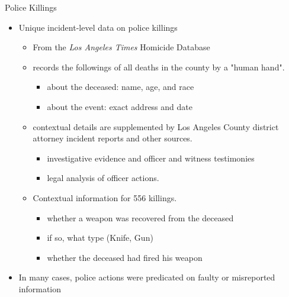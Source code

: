 \documentclass[dvipdfmx]{beamer}
\begin{document}
\begin{frame}{Police Killings}
  \begin{itemize}
    \item Unique incident-level data on police killings
    \begin{itemize}
      \item From the \textit{Los Angeles Times} Homicide Database
      \item records the followings of all deaths in the county by a "human hand".
      \begin{itemize}
        \item about the deceased: name, age, and race
        \item about the event: exact address and date
      \end{itemize}
      \item contextual details are supplemented by Los Angeles County district attorney incident reports and other sources.
      \begin{itemize}
        \item investigative evidence and officer and witness testimonies
        \item legal analysis of officer actions.
      \end{itemize}
      \item Contextual information for 556 killings.
      \begin{itemize}
        \item whether a weapon was recovered from the deceased
        \item if so, what type (Knife, Gun)
        \item whether the deceased had fired his weapon
      \end{itemize}
    \end{itemize}
    \item In many cases, police actions were predicated on faulty or misreported information
  \end{itemize}
\end{frame}
\end{document}
